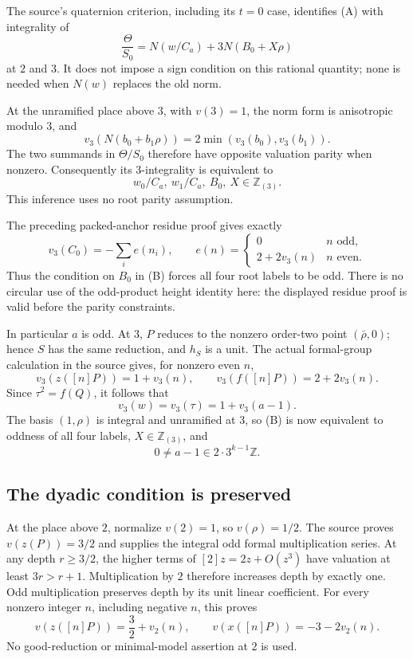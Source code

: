 The source's quaternion criterion, including its $t=0$ case, identifies
(A) with integrality of
\[
 \frac{\Theta}{S_0}
 =N(w/C_a)+3N(B_0+X\rho)
\]
at $2$ and $3$. It does not impose a sign condition on this rational
quantity; none is needed when $N(w)$ replaces the old norm.

At the unramified place above $3$, with $v(3)=1$, the norm form is
anisotropic modulo $3$, and
\[
 v_3(N(b_0+b_1\rho))=2\min(v_3(b_0),v_3(b_1)).
\]
The two summands in $\Theta/S_0$ therefore have opposite valuation
parity when nonzero. Consequently its $3$-integrality is equivalent to
\[
 w_0/C_a,\ w_1/C_a,\ B_0,\ X\in\mathbb Z_{(3)}.       \tag{B}
\]
This inference uses no root parity assumption.

The preceding packed-anchor residue proof gives exactly
\[
 v_3(C_0)=-\sum_i e(n_i),\qquad
 e(n)=\begin{cases}0&n\text{ odd},\\2+2v_3(n)&n\text{ even}.
 \end{cases}
\]
Thus the condition on $B_0$ in (B) forces all four root labels to be odd.
There is no circular use of the odd-product height identity here: the
displayed residue proof is valid before the parity constraints.

In particular $a$ is odd. At $3$, $P$ reduces to the nonzero order-two
point $(\bar\rho,0)$; hence $S$ has the same reduction, and $h_S$ is a
unit. The actual formal-group calculation in the source gives, for
nonzero even $n$,
\[
 v_3(z([n]P))=1+v_3(n),\qquad v_3(f([n]P))=2+2v_3(n).
\]
Since $\tau^2=f(Q)$, it follows that
\[
 v_3(w)=v_3(\tau)=1+v_3(a-1).
\]
The basis $(1,\rho)$ is integral and unramified at $3$, so (B) is now
equivalent to oddness of all four labels, $X\in\mathbb Z_{(3)}$, and
\[
 0\ne a-1\in 2\cdot3^{k-1}\mathbb Z.             \tag{C}
\]

\subsection{The dyadic condition is preserved}

At the place above $2$, normalize $v(2)=1$, so $v(\rho)=1/2$.
The source proves $v(z(P))=3/2$ and supplies the integral odd formal
multiplication series. At any depth $r\ge3/2$, the higher terms of
$[2]z=2z+O(z^3)$ have valuation at least $3r>r+1$. Multiplication by
$2$ therefore increases depth by exactly one. Odd multiplication
preserves depth by its unit linear coefficient. For every nonzero integer
$n$, including negative $n$, this proves
\[
 v(z([n]P))=\frac32+v_2(n),\qquad
 v(x([n]P))=-3-2v_2(n).
\]
No good-reduction or minimal-model assertion at $2$ is used.

